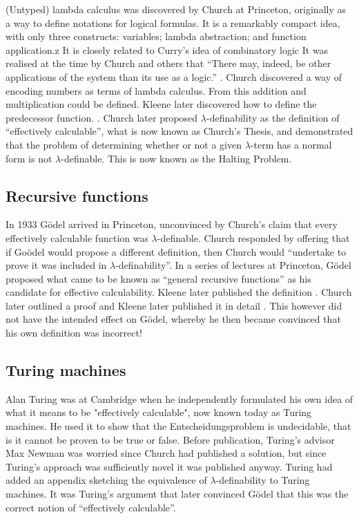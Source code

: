 (Untyped) lambda calculus was discovered by Church at Princeton, originally as a way to define notations for logical formulas. It is a remarkably compact idea, with only three constructs: variables; lambda abstraction; and function application.z It is closely related to Curry's idea of combinatory logic \cite{curry1930a, curry1930b} It was realised at the time by Church and others that ``There may, indeed, be other applications of the system than its use as a logic.'' \cite{church1932, church1933}. Church discovered a way of encoding numbers as terms of lambda calculus. From this addition and multiplication could be defined. Kleene later discovered how to define the predecessor function. \cite{kleene1935a, kleene1935b}. Church later proposed $\lambda$-definability as the definition of ``effectively calculable'', what is now known as Church's Thesis, and demonstrated that the problem of determining whether or not a given $\lambda$-term  has a normal form is not $\lambda$-definable. This is now known as the Halting Problem. 

\subsection{Recursive functions}

In 1933 G\"odel arrived in Princeton, unconvinced by Church's claim that every effectively calculable function was $\lambda$-definable. Church responded by offering that if Go\"odel would propose a different definition, then Church would ``undertake to prove it was included in $\lambda$-definability''. In a series of lectures at Princeton, G\"odel proposed what came to be known as ``general recursive functions'' as his candidate for effective calculability. Kleene later published the definition \cite{kleene1936}. Church later outlined a proof \cite{church1936} and Kleene later published it in detail \cite{kleene1936b}. This however did not have the intended effect on G\"odel, whereby he then became convinced that his own definition was incorrect!

\subsection{Turing machines}

Alan Turing was at Cambridge when he independently formulated his own idea of what it means to be "effectively calculable", now known today as Turing machines. He used it to show that the Entscheidungsproblem is undecidable, that is it cannot be proven to be true or false. Before publication, Turing's advisor Max Newman was worried since Church had published a solution, but since Turing's approach was sufficiently novel it was published anyway. Turing had added an appendix sketching the equivalence of $\lambda$-definability to Turing machines. It was Turing's argument that later convinced G\"odel that this was the correct notion of ``effectively calculable''.

